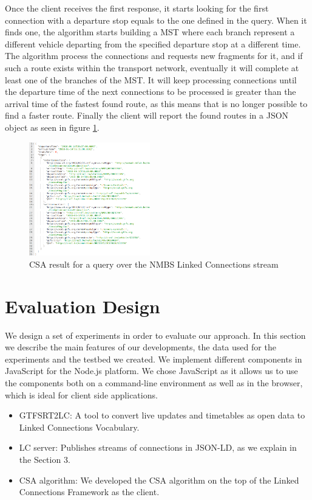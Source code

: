 \documentclass[sw]{iosart2x}
\begin{document}
	Once the client receives the first response, it starts looking for the first connection with a departure stop equals to the one defined in the query. When it finds one, the algorithm starts building a MST where each branch represent a different vehicle departing from the specified departure stop at a different time. The algorithm process the connections and requests new fragments for it, and if such a route exists within the transport network, eventually it will complete at least one of the branches of the MST. It will keep processing connections until the departure time of the next connections to be processed is greater than the arrival time of the fastest found route, as this means that is no longer possible to find a faster route. Finally the client will report the found routes in a JSON object as seen in figure \ref{fig:nmbs_csa}. 
	
	\begin{figure}[t]
		\includegraphics[width=0.47\textwidth]{images/csa_result.png}
		\caption{CSA result for a query over the NMBS Linked Connections stream}\label{fig:nmbs_csa}
	\end{figure}
	
	\section{Evaluation Design}
	
	We design a set of experiments in order to evaluate our approach. In this section we describe the main features of our developments, the data used for the experiments and the testbed we created. We implement different components in JavaScript for the Node.js platform. We chose JavaScript as it allows us to use the components both on a command-line environment as well as in the browser, which is ideal for client side applications.
	\begin{itemize}
	\item GTFSRT2LC: A tool to convert live updates and timetables as open data to Linked Connections Vocabulary.
	\item LC server: Publishes streams of connections in JSON-LD, as we explain in the Section 3.
	\item CSA algorithm: We developed the CSA algorithm on the top of the Linked Connections Framework as the client.
	\end{itemize}
	
\end{document}
